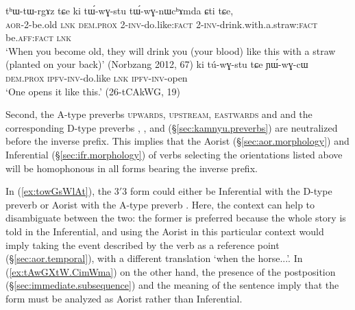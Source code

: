 \begin{exe}
	\ex   \label{ex:tuwGstu.ambiguity}
	\begin{xlist}
		\ex   \label{ex:ki.tWwGstu}
		\gll tʰɯ-tɯ-rgɤz tɕe ki tɯ́-wɣ-stu tɯ́-wɣ-nɯcʰɤmda ɕti tɕe, \\
		\textsc{aor}-2-be.old \textsc{lnk} \textsc{dem}.\textsc{prox} 2-\textsc{inv}-do.like:\textsc{fact} 2-\textsc{inv}-drink.with.a.straw:\textsc{fact} be.\textsc{aff}:\textsc{fact} \textsc{lnk} \\
		\glt `When you become old, they will drink you (your blood) like this with a straw (planted on your back)' (Norbzang 2012, 67)
		\ex   \label{ex:ki.tuwGstu}
		\gll ki tú-wɣ-stu tɕe ɲɯ́-wɣ-cɯ  \\
		\textsc{dem}.\textsc{prox} \textsc{ipfv}-\textsc{inv}-do.like \textsc{lnk} \textsc{ipfv}-\textsc{inv}-open \\
		\glt `One opens it like this.' (26-tCAkWG, 19)
	\end{xlist}
\end{exe}

Second, the A-type preverbs  \textsc{upwards},  \textsc{upstream},  \textsc{eastwards} and  and the corresponding D-type preverbs , ,  and  (§\ref{sec:kamnyu.preverbs}) are neutralized before the inverse prefix. This implies that the Aorist (§\ref{sec:aor.morphology}) and Inferential (§\ref{sec:ifr.morphology}) of verbs selecting the orientations listed above will be homophonous in all forms bearing the inverse prefix.

In (\ref{ex:towGsWlAt}), the 3$'$\fl{}3 form  could either be Inferential  with the D-type preverb  or Aorist  with the A-type preverb . Here, the context can help to disambiguate between the two: the former is preferred because the whole story is told in the Inferential, and using the Aorist in this particular context would imply taking the event described by the verb as a reference point (§\ref{sec:aor.temporal}), with a different translation `when the horse...'. In (\ref{ex:tAwGXtW.CimWma}) on the other hand, the presence of the postposition  (§\ref{sec:immediate.subsequence}) and the meaning of the sentence imply that the form  must be analyzed as Aorist rather than Inferential.

